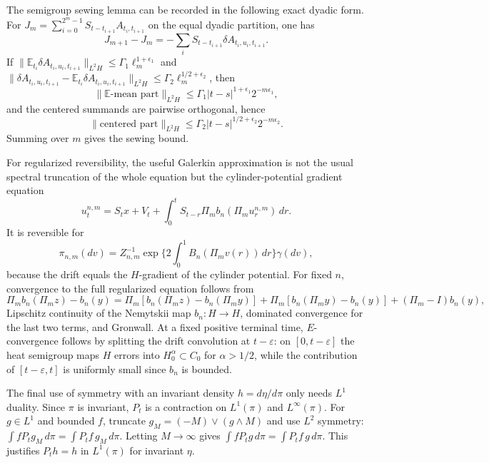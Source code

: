\documentclass[12pt]{article}
\newcommand{\E}{\mathbb E}
\begin{document}
The semigroup sewing lemma can be recorded in the following exact dyadic
form.  For $J_m=\sum_{i=0}^{2^m-1}S_{t-t_{i+1}}A_{t_i,t_{i+1}}$ on the equal
dyadic partition, one has
\[
J_{m+1}-J_m=-\sum_i S_{t-t_{i+1}}\delta A_{t_i,u_i,t_{i+1}}.
\]
If
$\|\E_{t_i}\delta A_{t_i,u_i,t_{i+1}}\|_{L^2H}\le \Gamma_1\ell_m^{1+\epsilon_1}$
and
$\|\delta A_{t_i,u_i,t_{i+1}}-\E_{t_i}\delta A_{t_i,u_i,t_{i+1}}\|_{L^2H}
\le \Gamma_2\ell_m^{1/2+\epsilon_2}$, then
\[
\|\E\text{-mean part}\|_{L^2H}\le
\Gamma_1 |t-s|^{1+\epsilon_1}2^{-m\epsilon_1},
\]
and the centered summands are pairwise orthogonal, hence
\[
\|\text{centered part}\|_{L^2H}\le
\Gamma_2 |t-s|^{1/2+\epsilon_2}2^{-m\epsilon_2}.
\]
Summing over $m$ gives the sewing bound.

For regularized reversibility, the useful Galerkin approximation is not the
usual spectral truncation of the whole equation but the cylinder-potential
gradient equation
\[
u_t^{n,m}=S_tx+V_t+\int_0^tS_{t-r}\Pi_m b_n(\Pi_m u_r^{n,m})\,dr.
\]
It is reversible for
\[
\pi_{n,m}(dv)=Z_{n,m}^{-1}\exp\{2\int_0^1B_n(\Pi_m v(r))\,dr\}\gamma(dv),
\]
because the drift equals the $H$-gradient of the cylinder potential.  For
fixed $n$, convergence to the full regularized equation follows from
\[
\Pi_m b_n(\Pi_m z)-b_n(y)
=\Pi_m[b_n(\Pi_m z)-b_n(\Pi_m y)]
 +\Pi_m[b_n(\Pi_m y)-b_n(y)]+(\Pi_m-I)b_n(y),
\]
Lipschitz continuity of the Nemytskii map $b_n:H\to H$, dominated convergence
for the last two terms, and Gronwall.  At a fixed positive terminal time,
$E$-convergence follows by splitting the drift convolution at $t-\varepsilon$:
on $[0,t-\varepsilon]$ the heat semigroup maps $H$ errors into
$H_0^\alpha\subset C_0$ for $\alpha>1/2$, while the contribution of
$[t-\varepsilon,t]$ is uniformly small since $b_n$ is bounded.

The final use of symmetry with an invariant density $h=d\eta/d\pi$ only needs
$L^1$ duality.  Since $\pi$ is invariant, $P_t$ is a contraction on
$L^1(\pi)$ and $L^\infty(\pi)$.  For $g\in L^1$ and bounded $f$, truncate
$g_M=(-M)\vee(g\wedge M)$ and use $L^2$ symmetry:
$\int f P_tg_M\,d\pi=\int P_tf\,g_M\,d\pi$.  Letting $M\to\infty$ gives
$\int fP_tg\,d\pi=\int P_tf\,g\,d\pi$.  This justifies $P_th=h$ in
$L^1(\pi)$ for invariant $\eta$.
\end{document}

